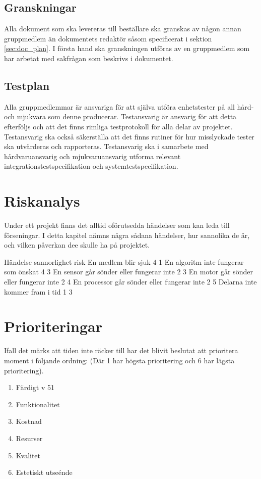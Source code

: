 \documentclass[a4paper,11pt]{article}
\begin{document}
    \subsection{Granskningar}
    Alla dokument som ska levereras till beställare ska granskas av någon annan gruppmedlem än dokumentets redaktör såsom specificerat i sektion \ref{sec:doc_plan}. I första hand ska granskningen utföras av en gruppmedlem som har arbetat med sakfrågan som beskrivs i dokumentet.
    
    \subsection{Testplan}
    Alla gruppmedlemmar är ansvariga för att själva utföra enhetstester på all hård- och mjukvara som denne producerar. Testansvarig är ansvarig för att detta efterföljs och att det finns rimliga testprotokoll för alla delar av projektet. Testansvarig ska också säkerställa att det finns rutiner för hur misslyckade tester ska utvärderas och rapporteras. Testansvarig ska i samarbete med hårdvaruansvarig och mjukvaruansvarig utforma relevant integrationstestspecifikation och systemtestspecifikation.
    
    \section{Riskanalys}
    Under ett projekt finns det alltid oförutsedda händelser som kan leda till förseningar. I detta kapitel nämns några sådana händelser, hur sannolika de är, och vilken påverkan dee skulle ha på projektet.

    Händelse sannorlighet risk
    En medlem blir sjuk 4 1
    En algoritm inte fungerar som önskat 4 3
    En sensor går sönder eller fungerar inte 2 3
    En motor går sönder eller fungerar inte 2 4
    En processor går sönder eller fungerar inte 2 5
    Delarna inte kommer fram i tid 1 3
    
    
    \section{Prioriteringar}
    Ifall det märks att tiden inte räcker till har det blivit beslutat att prioritera moment i följande ordning: (Där 1 har högsta prioritering och 6 har lägsta prioritering).
    
    \begin{enumerate}
        \item Färdigt v 51
        \item Funktionalitet %
        \item Kostnad %
        \item Resurser %
        \item Kvalitet %
        \item Estetiskt utseénde
    \end{enumerate}
    
\end{document}
